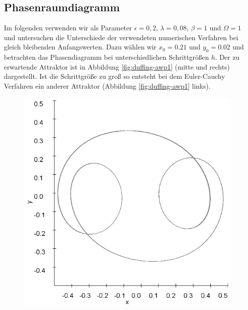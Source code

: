 \documentclass{scrartcl}
\begin{document}
\subsection { Phasenraumdiagramm }
Im folgenden verwenden wir als Parameter $\epsilon = 0,2$, $\lambda = 0,08$, $\beta = 1$ und $\Omega = 1$ und untersuchen die Unterschiede der verwendeten numerischen Verfahren bei gleich bleibenden Anfangswerten. Dazu wählen wir $x_0=0.21$ und $y_0=0.02$ und betrachten das Phasendiagramm bei unterschiedlichen Schrittgrößen $h$. Der zu erwartende Attraktor ist in Abbildung \ref{fig:duffing-awp1} (mitte und rechts) dargestellt. Ist die Schrittgröße zu groß so entsteht bei dem Euler-Cauchy Verfahren ein anderer Attraktor (Abbildung \ref{fig:duffing-awp1} links).
\begin{figure}[!htbp]
\includegraphics[scale=0.28]{duffing-awp1-500k-nach-500k-h0,1-euler}

\end{figure}
\end{document}
